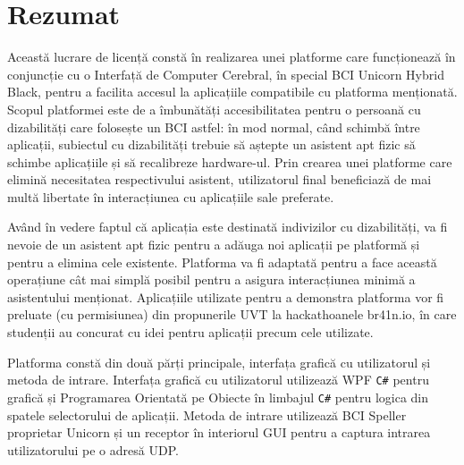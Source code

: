 
\chapter*{Rezumat}\label{cap:abstract_ro}

\hspace{\parindent} Această lucrare de licență constă în realizarea unei platforme care funcționează în conjuncție cu o Interfață de Computer Cerebral, în special BCI Unicorn Hybrid Black\cite{Unicorn_Technology}, pentru a facilita accesul la aplicațiile compatibile cu platforma menționată. Scopul platformei este de a îmbunătăți accesibilitatea pentru o persoană cu dizabilități care folosește un BCI astfel: în mod normal, când schimbă între aplicații, subiectul cu dizabilități trebuie să aștepte un asistent apt fizic să schimbe aplicațiile și să recalibreze hardware-ul. Prin crearea unei platforme care elimină necesitatea respectivului asistent, utilizatorul final beneficiază de mai multă libertate în interacțiunea cu aplicațiile sale preferate.

\vspace*{2mm}
\hspace{\parindent} Având în vedere faptul că aplicația este destinată indivizilor cu dizabilități, va fi nevoie de un asistent apt fizic pentru a adăuga noi aplicații pe platformă și pentru a elimina cele existente. Platforma va fi adaptată pentru a face această operațiune cât mai simplă posibil pentru a asigura interacțiunea minimă a asistentului menționat. Aplicațiile utilizate pentru a demonstra platforma vor fi preluate (cu permisiunea) din propunerile UVT la hackathoanele br41n.io, în care studenții au concurat cu idei pentru aplicații precum cele utilizate.

\vspace*{2mm}
\hspace{\parindent} Platforma constă din două părți principale, interfața grafică cu utilizatorul și metoda de intrare. Interfața grafică cu utilizatorul utilizează WPF \texttt{C\#} pentru grafică și Programarea Orientată pe Obiecte în limbajul \texttt{C\#} pentru logica din spatele selectorului de aplicații. Metoda de intrare utilizează BCI Speller proprietar Unicorn\cite{Unicorn_Speller} și un receptor în interiorul GUI pentru a captura intrarea utilizatorului pe o adresă UDP.


